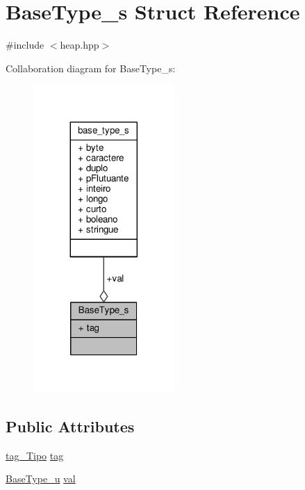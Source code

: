 \hypertarget{structBaseType__s}{\section{Base\+Type\+\_\+s Struct Reference}
\label{structBaseType__s}
}


{\ttfamily \#include $<$heap.\+hpp$>$}



Collaboration diagram for Base\+Type\+\_\+s\+:\nopagebreak
\begin{figure}[H]
\begin{center}
\leavevmode
\includegraphics[width=152pt]{structBaseType__s__coll__graph}
\end{center}
\end{figure}
\subsection*{Public Attributes}
\begin{DoxyCompactItemize}
\item 
\hyperlink{heap_8hpp_abae472b4761acff5c0e2e945a106d1a0}{tag\+\_\+\+Tipo} \hyperlink{structBaseType__s_ac322ffb6eecffd6faf80113b91dc9f50}{tag}
\item 
\hyperlink{heap_8hpp_a19f79bf7b0c34f691bdd56ae53f83c35}{Base\+Type\+\_\+u} \hyperlink{structBaseType__s_ac5f95f494b8b6612055e4bce8a07ddca}{val}
\end{DoxyCompactItemize}


